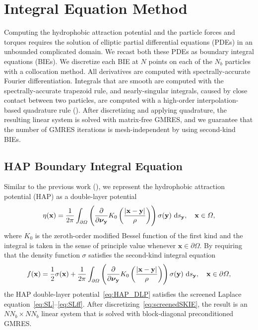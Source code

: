 \documentclass[lineno]{jfm}
\newcommand{\bd}{\partial}
\newcommand{\nnu}{\boldsymbol{\nu}}
\newcommand{\xx}{\mathbf{x}}
\newcommand{\yy}{\mathbf{y}}
\newcommand{\pderiv}[2]{\frac{\partial #1}{\partial #2}}
\begin{document}



\section{Integral Equation Method}
\label{sec:IEM}
Computing the hydrophobic attraction potential and the particle forces
and torques requires the solution of elliptic partial differential
equations (PDEs) in an unbounded complicated domain. We recast both these
PDEs as boundary integral equations (BIEs). We discretize each BIE at
$N$ points on each of the $N_b$ particles with a collocation method.
All derivatives are computed with spectrally-accurate
Fourier differentiation. Integrals that are smooth are computed with
the spectrally-accurate trapezoid rule, and nearly-singular integrals,
caused by close contact between two particles, are computed with a
high-order interpolation-based quadrature rule (\cite{qua-bir2014}).
After discretizing and applying quadrature, the resulting linear system
is solved with matrix-free GMRES, and we guarantee that the number of
GMRES iterations is mesh-independent by using second-kind BIEs.


\subsection{HAP Boundary Integral Equation}
Similar to the previous work (\cite{Fu20}), we represent the
hydrophobic attraction potential (HAP) as a double-layer
potential
\begin{align}
  \label{eq:HAP_DLP}
  \eta (\xx) = \frac{1}{2\pi} \int_{\bd\Omega} \left(\pderiv{}{\nnu_\yy}
    K_0 \left(\frac{|\xx - \yy|}{\rho}\right)\right) 
    \sigma(\yy) \, \dif s_\yy, \quad \xx \in \Omega,
\end{align}
where $K_0$ is the zeroth-order modified Bessel function of the first
kind and the integral is taken in the sense of principle value whenever
$\xx \in \partial \Omega$.  By requiring that the density function
$\sigma$ satisfies the second-kind integral equation
\begin{equation}
\label{eq:screenedSKIE}
  f(\xx) = \frac{1}{2}\sigma(\xx) + 
    \frac{1}{2\pi}\int_{\bd\Omega} \left(\pderiv{}{\nnu_\yy}
    K_0 \left(\frac{|\xx - \yy|}{\rho}\right)\right) \sigma(\yy) \, 
    \dif s_\yy, \quad \xx \in \bd\Omega,
\end{equation}
the HAP double-layer potential~\eqref{eq:HAP_DLP} satisfies the screened
Laplace equation~\eqref{eq:SL}--\eqref{eq:SLff}. After
discretizing~\eqref{eq:screenedSKIE}, the result is an $NN_b \times
NN_b$ linear system that is solved with block-diagonal preconditioned
GMRES.
\end{document}
